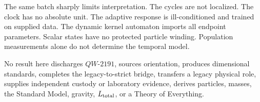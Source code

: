 \documentclass[11pt,a4paper]{article}
\theoremstyle{definition}
\theoremstyle{remark}
\begin{document}
The same batch sharply limits interpretation. The cycles are not localized. The clock has no absolute unit. The adaptive response is ill-conditioned and trained on supplied data. The dynamic kernel automaton imports all endpoint parameters. Scalar states have no protected particle winding. Population measurements alone do not determine the temporal model.

No result here discharges $QW\text{-}2191$, sources orientation, produces dimensional standards, completes the legacy-to-strict bridge, transfers a legacy physical role, supplies independent custody or laboratory evidence, derives particles, masses, the Standard Model, gravity, $L_{\rm total}$, or a Theory of Everything.
\end{document}
